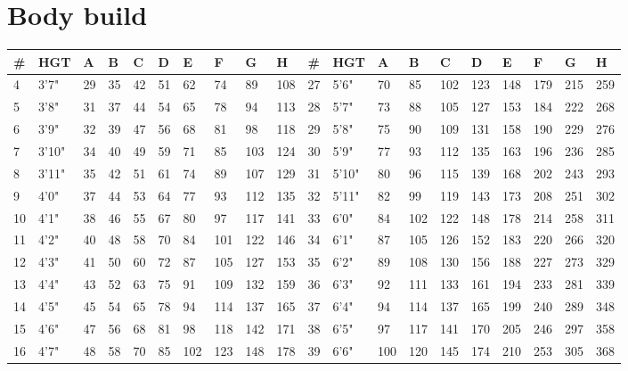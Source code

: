 \section{Body build}
\begin{normbox}
\begin{tabularx}{\linewidth}{@{} X X X X X X X X X X | X X X X X X X X X X}
\small
\textbf{\#} & \textbf{HGT} & \textbf{A} & \textbf{B} & \textbf{C} & \textbf{D} & \textbf{E} & \textbf{F} & \textbf{G} & \textbf{H} & \textbf{\#} & \textbf{HGT} & \textbf{A} & \textbf{B} & \textbf{C} & \textbf{D} & \textbf{E} & \textbf{F} & \textbf{G} & \textbf{H}\\
\midrule
4 & 3'7" & 29 & 35 & 42 & 51 & 62 & 74 & 89 & 108 & 27 & 5'6" & 70 & 85 & 102 & 123 & 148 & 179 & 215 & 259\\
5 & 3'8" & 31 & 37 & 44 & 54 & 65 & 78 & 94 & 113 & 28 & 5'7" & 73 & 88 & 105 & 127 & 153 & 184 & 222 & 268\\
6 & 3'9" & 32 & 39 & 47 & 56 & 68 & 81 & 98 & 118 & 29 & 5'8" & 75 & 90 & 109 & 131 & 158 & 190 & 229 & 276\\
7 & 3'10" & 34 & 40 & 49 & 59 & 71 & 85 & 103 & 124 & 30 & 5'9" & 77 & 93 & 112 & 135 & 163 & 196 & 236 & 285\\
8 & 3'11" & 35 & 42 & 51 & 61 & 74 & 89 & 107 & 129 & 31 & 5'10" & 80 & 96 & 115 & 139 & 168 & 202 & 243 & 293\\
9 & 4'0" & 37 & 44 & 53 & 64 & 77 & 93 & 112 & 135 & 32 & 5'11" & 82 & 99 & 119 & 143 & 173 & 208 & 251 & 302\\
10 & 4'1" & 38 & 46 & 55 & 67 & 80 & 97 & 117 & 141 & 33 & 6'0" & 84 & 102 & 122 & 148 & 178 & 214 & 258 & 311\\
11 & 4'2" & 40 & 48 & 58 & 70 & 84 & 101 & 122 & 146 & 34 & 6'1" & 87 & 105 & 126 & 152 & 183 & 220 & 266 & 320\\
12 & 4'3" & 41 & 50 & 60 & 72 & 87 & 105 & 127 & 153 & 35 & 6'2" & 89 & 108 & 130 & 156 & 188 & 227 & 273 & 329\\
13 & 4'4" & 43 & 52 & 63 & 75 & 91 & 109 & 132 & 159 & 36 & 6'3" & 92 & 111 & 133 & 161 & 194 & 233 & 281 & 339\\
14 & 4'5" & 45 & 54 & 65 & 78 & 94 & 114 & 137 & 165 & 37 & 6'4" & 94 & 114 & 137 & 165 & 199 & 240 & 289 & 348\\
15 & 4'6" & 47 & 56 & 68 & 81 & 98 & 118 & 142 & 171 & 38 & 6'5" & 97 & 117 & 141 & 170 & 205 & 246 & 297 & 358\\
16 & 4'7" & 48 & 58 & 70 & 85 & 102 & 123 & 148 & 178 & 39 & 6'6" & 100 & 120 & 145 & 174 & 210 & 253 & 305 & 368\\

\end{tabularx}
\end{normbox}
